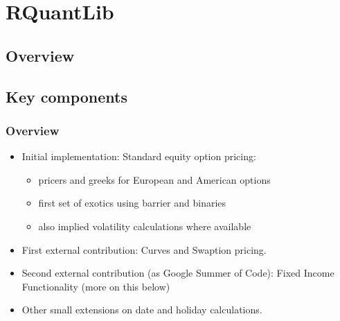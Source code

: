 \documentclass[compress]{beamer}
\begin{document}
\section{RQuantLib}
\subsection{Overview}
\subsection{Key components}
\begin{frame}
  \frametitle{Overview}
  \begin{itemize}
  \item Initial implementation: Standard equity option pricing:
    \begin{itemize}
      \item pricers and greeks for European and American options
      \item first set of exotics using barrier and binaries
      \item also implied volatility calculations where available
    \end{itemize}
  \item First external contribution: Curves and Swaption pricing.
  \item Second external contribution (as Google Summer of Code): Fixed Income
    Functionality (more on this below)
  \item Other small extensions on date and holiday calculations.
  \end{itemize}
\end{frame}
\end{document}
